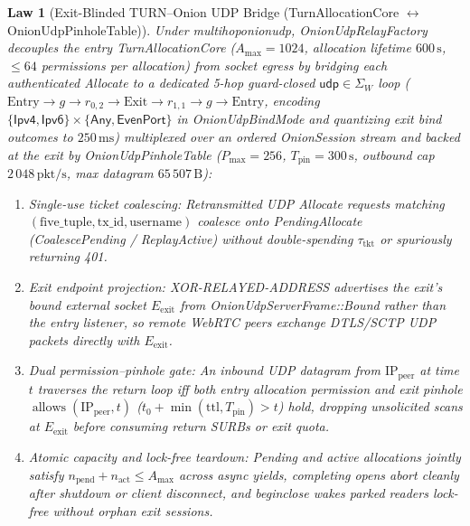 \documentclass[journal]{IEEEtran}
\newtheorem{law}{Law}
\DeclareRobustCommand{\code}[1]{{\ttfamily\renewcommand{\_}{\textunderscore\allowbreak}#1}}
\begin{document}
\begin{law}[Exit-Blinded TURN--Onion UDP Bridge (\code{Turn\allowbreak Allocation\allowbreak Core} $\leftrightarrow$ \code{Onion\allowbreak Udp\allowbreak Pinhole\allowbreak Table})]\label{law:turn-onion-bridge}
Under \code{multi\_hop\_onion\_udp}, \code{Onion\allowbreak Udp\allowbreak Relay\allowbreak Factory} decouples the entry \code{Turn\allowbreak Allocation\allowbreak Core} ($A_{\max}=1024$, allocation lifetime $600\,\mathrm{s}$, $\le 64$ permissions per allocation) from socket egress by bridging each authenticated \code{Allocate} to a dedicated 5-hop guard-closed $\mathsf{udp}\in\Sigma_W$ loop ($\mathrm{Entry}\allowbreak\to g\allowbreak\to r_{0,2}\allowbreak\to \mathrm{Exit}\allowbreak\to r_{1,1}\allowbreak\to g\allowbreak\to \mathrm{Entry}$, encoding $\{\mathsf{Ipv4},\allowbreak\mathsf{Ipv6}\}\allowbreak\times\{\mathsf{Any},\allowbreak\mathsf{EvenPort}\}$ in \code{Onion\allowbreak Udp\allowbreak Bind\allowbreak Mode} and quantizing exit bind outcomes to $250\,\mathrm{ms}$) multiplexed over an ordered \code{OnionSession} stream and backed at the exit by \code{Onion\allowbreak Udp\allowbreak Pinhole\allowbreak Table} ($P_{\max}=256$, $T_{\mathrm{pin}}=300\,\mathrm{s}$, outbound cap $2\,048\,\mathrm{pkt/s}$, max datagram $65\,507\,\mathrm{B}$):
\begin{enumerate}[leftmargin=1.5em]
\item \emph{Single-use ticket coalescing:} Retransmitted UDP \code{Allocate} requests matching $(\text{five\_tuple},\mathrm{tx\_id},\mathrm{username})$ coalesce onto \code{PendingAllocate} (\code{CoalescePending} / \code{ReplayActive}) without double-spending $\tau_{\mathrm{tkt}}$ or spuriously returning \code{401}.
\item \emph{Exit endpoint projection:} \code{XOR-RELAYED-ADDRESS} advertises the exit's bound external socket $E_{\mathrm{exit}}$ from \code{OnionUdpServerFrame::Bound} rather than the entry listener, so remote WebRTC peers exchange DTLS/SCTP UDP packets directly with $E_{\mathrm{exit}}$.
\item \emph{Dual permission--pinhole gate:} An inbound UDP datagram from $\mathrm{IP}_{\mathrm{peer}}$ at time $t$ traverses the return loop iff both entry allocation permission and exit pinhole $\operatorname{allows}(\mathrm{IP}_{\mathrm{peer}},t)$ ($t_0+\min(\mathrm{ttl},T_{\mathrm{pin}})>t$) hold, dropping unsolicited scans at $E_{\mathrm{exit}}$ before consuming return SURBs or exit quota.
\item \emph{Atomic capacity and lock-free teardown:} Pending and active allocations jointly satisfy $n_{\mathrm{pend}}+n_{\mathrm{act}}\le A_{\max}$ across async yields, completing opens abort cleanly after shutdown or client disconnect, and \code{begin\_close} wakes parked readers lock-free without orphan exit sessions.

\end{enumerate}
\end{law}
\end{document}

